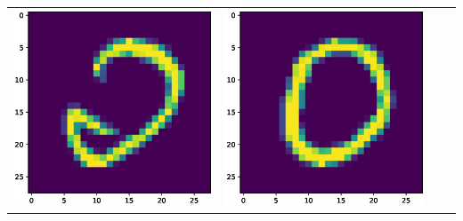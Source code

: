 \documentclass{article}
\begin{document}
\begin{tabular}{cccc}
\includegraphics[scale=.1]{fig/MNIST_653_2_0_653_2.eps} &
\includegraphics[scale=.1]{fig/MNIST_653_2_1_171_0.eps}&

\end{tabular}
\end{document}
